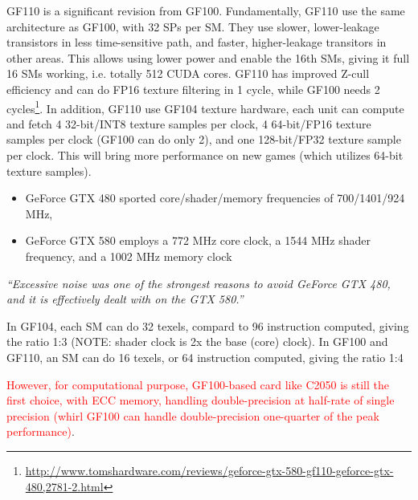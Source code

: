 GF110 is a significant revision from GF100. Fundamentally, GF110 use the same
architecture as GF100, with 32 SPs per SM. They use slower, lower-leakage
transistors in less time-sensitive path, and faster, higher-leakage transitors
in other areas. This allows using lower power and enable the 16th SMs, giving it
full 16 SMs working, i.e. totally 512 CUDA cores. GF110 has improved Z-cull
efficiency and can do FP16 texture filtering in 1 cycle, while GF100 needs 2
cycles\footnote{\url{http://www.tomshardware.com/reviews/geforce-gtx-580-gf110-geforce-gtx-480,2781-2.html}}.
In addition, GF110 use GF104 texture hardware, each unit can compute and fetch 4
32-bit/INT8 texture samples per clock, 4 64-bit/FP16 texture samples per clock
(GF100 can do only 2), and one 128-bit/FP32 texture sample per clock. This will
bring more performance on new games (which utilizes 64-bit texture samples).
\begin{itemize}
  \item  GeForce GTX 480 sported core/shader/memory frequencies of 700/1401/924
  MHz, 
  \item GeForce GTX 580 employs a 772 MHz core clock, a 1544 MHz shader
  frequency, and a 1002 MHz memory clock
\end{itemize}
{\it ``Excessive noise was one of the strongest reasons to avoid GeForce GTX
480, and it is effectively dealt with on the GTX 580.''}

In GF104, each SM can do 32 texels, compard to 96 instruction computed, giving
the ratio 1:3 (NOTE: shader clock is 2x the base (core) clock). In GF100 and
GF110, an SM can do 16 texels, or 64 instruction computed, giving the ratio 1:4 

\textcolor{red}{However, for computational purpose, GF100-based card like C2050
is still the first choice, with ECC memory, handling double-precision at half-rate of single
precision (whirl GF100 can handle double-precision one-quarter of the peak
performance)}.

